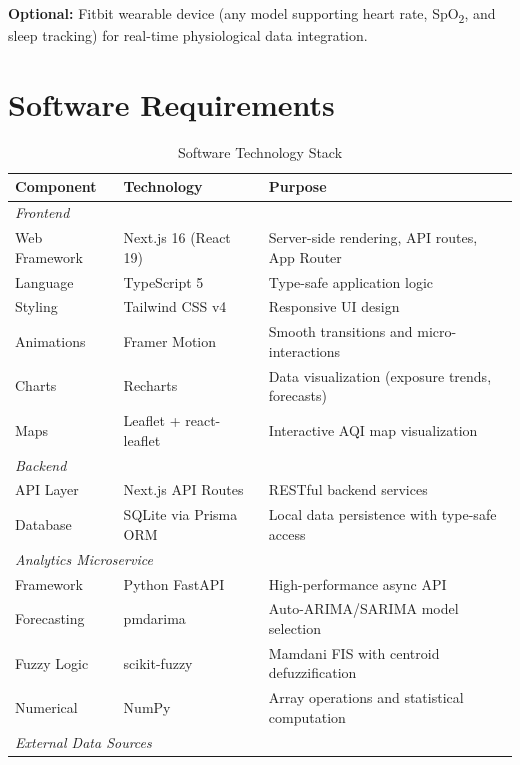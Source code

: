 \documentclass[12pt,a4paper]{report}
\begin{document}
\textbf{Optional:} Fitbit wearable device (any model supporting heart rate, SpO\textsubscript{2}, and sleep tracking) for real-time physiological data integration.

\section{Software Requirements}

\begin{table}[H]
\centering
\caption{Software Technology Stack}
\label{tab:software}
\begin{tabularx}{\textwidth}{llX}
\toprule
\textbf{Component} & \textbf{Technology} & \textbf{Purpose} \\
\midrule
\multicolumn{3}{l}{\textit{Frontend}} \\
\midrule
Web Framework    & Next.js 16 (React 19)  & Server-side rendering, API routes, App Router \\
Language         & TypeScript 5           & Type-safe application logic \\
Styling          & Tailwind CSS v4        & Responsive UI design \\
Animations       & Framer Motion          & Smooth transitions and micro-interactions \\
Charts           & Recharts               & Data visualization (exposure trends, forecasts) \\
Maps             & Leaflet + react-leaflet & Interactive AQI map visualization \\
\midrule
\multicolumn{3}{l}{\textit{Backend}} \\
\midrule
API Layer        & Next.js API Routes     & RESTful backend services \\
Database         & SQLite via Prisma ORM  & Local data persistence with type-safe access \\
\midrule
\multicolumn{3}{l}{\textit{Analytics Microservice}} \\
\midrule
Framework        & Python FastAPI         & High-performance async API \\
Forecasting      & pmdarima \cite{pmdarima2024} & Auto-ARIMA/SARIMA model selection \\
Fuzzy Logic      & scikit-fuzzy \cite{scikitfuzzy2019} & Mamdani FIS with centroid defuzzification \\
Numerical        & NumPy                  & Array operations and statistical computation \\
\midrule
\multicolumn{3}{l}{\textit{External Data Sources}} \\

\end{tabularx}
\end{table}
\end{document}
